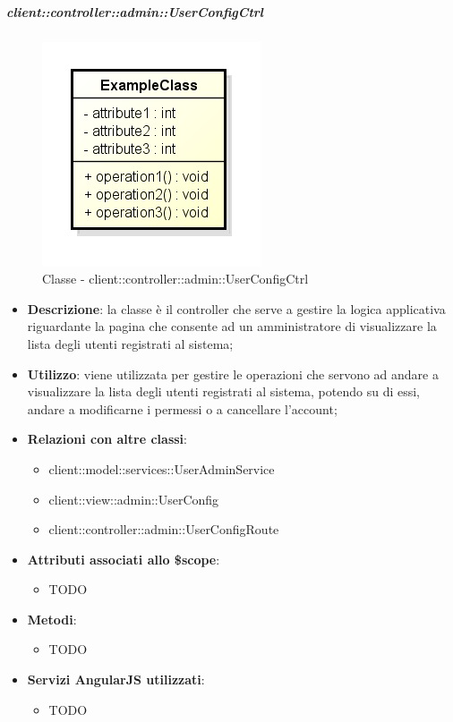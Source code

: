 		\subparagraph{client::controller::admin::UserConfigCtrl} %
		\label{subp:bdsm_app_client_controller_admin_userconfigctrl}
			\begin{figure}[htbp]
				\centering
				\centerline{\includegraphics[scale=0.7]{./images/client/classes/example_class.png}}
				\caption{Classe - client::controller::admin::UserConfigCtrl}
			\end{figure}
			\begin{itemize}
				\item \textbf{Descrizione}: la classe è il controller che serve a gestire la logica applicativa riguardante la pagina che consente ad un amministratore di visualizzare la lista degli utenti registrati al sistema;
				\item \textbf{Utilizzo}: viene utilizzata per gestire le operazioni che servono ad andare a visualizzare la lista degli utenti registrati al sistema, potendo su di essi, andare a modificarne i permessi o a cancellare l'account;
				\item \textbf{Relazioni con altre classi}:
					\begin{itemize}
						\item client::model::services::UserAdminService
						\item client::view::admin::UserConfig
						\item client::controller::admin::UserConfigRoute
					\end{itemize}

				\item \textbf{Attributi associati allo \$scope}:
					\begin{itemize}
						\item TODO
					\end{itemize}

				\item \textbf{Metodi}:
					\begin{itemize}
						\item TODO
					\end{itemize}

				\item \textbf{Servizi AngularJS utilizzati}:
					\begin{itemize}
						\item TODO
					\end{itemize}

			\end{itemize}


